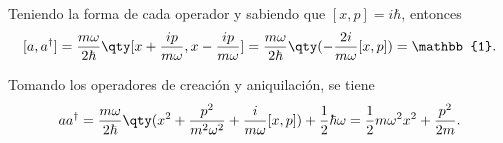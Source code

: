 \begin{ejercicio}
	Teniendo la forma de cada operador y sabiendo que $[x,p] = i\hbar$, entonces
	$$
		[a,a^\dagger] = \frac{m\omega}{2\hbar} \qty[ x + \frac{ip}{m\omega}, x - \frac{ip}{m\omega} ] = \frac{m\omega}{2\hbar} \qty(-\frac{2i}{m\omega} [x,p]) = \mathbb{1} .
	$$
\end{ejercicio}

\begin{ejercicio}
	Tomando los operadores de creación y aniquilación, se tiene
		$$
			aa^\dagger = \frac{m\omega}{2\hbar} \qty(x^2 + \frac{p^2}{m^2 \omega ^2} + \frac{i}{m\omega} [x,p]) + \frac{1}{2} \hbar \omega = \frac{1}{2} m\omega ^2 x^2 + \frac{p^2}{2m} .
		$$
\end{ejercicio}






